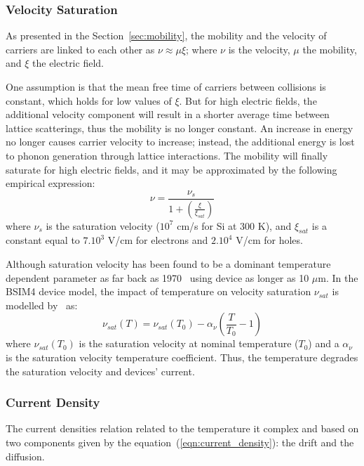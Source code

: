 \subsubsection{Velocity Saturation}    %
As presented in the Section~\ref{sec:mobility}, the mobility and the velocity of carriers are linked to each other as \(\nu \approx \mu \xi \); where \(\nu \) is the velocity, \(\mu \) the mobility, and \(\xi \) the electric field.

One assumption is that the mean free time of carriers between collisions is constant, which holds for low values of \(\xi \). But for high electric fields, the additional velocity component will result in a shorter average time between lattice scatterings, thus the mobility is no longer constant. An increase in energy no longer causes carrier velocity to increase; instead, the additional energy is lost to phonon generation through lattice interactions. The mobility will finally saturate for high electric fields, and it may be approximated by the following empirical expression: 
\begin{equation}
\label{eqn:vsat}
\nu = \frac{\nu_s}{1 + \left(\frac{\xi}{\xi_{sat}}\right)}
\end{equation}
where \(\nu_s \) is the saturation velocity (\(10^7 \) cm/s for Si at 300 K), and \(\xi_{sat}\) is a constant equal to \(7.10^3 \) V/cm for electrons and \(2.10^4 \) V/cm for holes.

Although saturation velocity has been found to be a dominant temperature dependent parameter as far back as 1970~\cite{Fowler1970} using device as longer as 10 \(\mu \)m. In the BSIM4 device model, the impact of temperature on velocity saturation \(\nu_{sat} \) is modelled by~\cite{Chain1997} as:
\begin{equation}
\label{eqn:vsat_T}
\nu_{sat}(T) = \nu_{sat}(T_0) - \alpha_\nu \left(\frac{T}{T_0}-1\right)
\end{equation}
where \(\nu_{sat}(T_0)\) is the saturation velocity at nominal temperature (\(T_0 \)) and a \(\alpha_\nu \) is the saturation velocity temperature coefficient. Thus, the temperature degrades the saturation velocity and devices' current.

\subsubsection{Current Density}        %
\label{sec:current_density}
The current densities relation related to the temperature it complex and based on two components given by the equation~(\ref{eqn:current_density}): the drift and the diffusion. 

